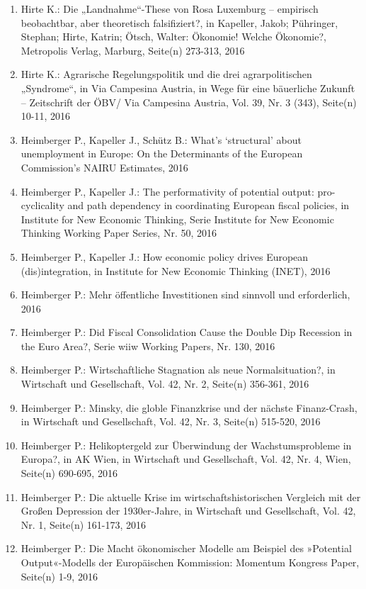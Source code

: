 \begin{enumerate}
	 \item Hirte K.: Die „Landnahme“-These von Rosa Luxemburg – empirisch beobachtbar, aber theoretisch falsifiziert?, in Kapeller, Jakob; Pühringer, Stephan; Hirte, Katrin; Ötsch, Walter: Ökonomie! Welche Ökonomie?, Metropolis Verlag, Marburg, Seite(n) 273-313, 2016
	 \item Hirte K.: Agrarische Regelungspolitik und die drei agrarpolitischen „Syndrome“, in Via Campesina Austria, in Wege für eine bäuerliche Zukunft – Zeitschrift der ÖBV/ Via Campesina Austria, Vol. 39, Nr. 3 (343), Seite(n) 10-11, 2016
	 \item Heimberger P., Kapeller J., Schütz B.: What’s ‘structural’ about unemployment in Europe: On the Determinants of the European Commission’s NAIRU Estimates, 2016
	 \item Heimberger P., Kapeller J.: The performativity of potential output: pro-cyclicality and path dependency in coordinating European fiscal policies, in Institute for New Economic Thinking, Serie Institute for New Economic Thinking  Working Paper Series, Nr. 50, 2016
	 \item Heimberger P., Kapeller J.: How economic policy drives European (dis)integration, in Institute for New Economic Thinking (INET), 2016
	 \item Heimberger P.: Mehr öffentliche Investitionen sind sinnvoll und erforderlich, 2016
	 \item Heimberger P.: Did Fiscal Consolidation Cause the Double Dip Recession in the Euro Area?, Serie wiiw Working Papers, Nr. 130, 2016
	 \item Heimberger P.: Wirtschaftliche Stagnation als \glqq neue Normalsituation\grqq{}?, in Wirtschaft und Gesellschaft, Vol. 42, Nr. 2, Seite(n) 356-361, 2016
	 \item Heimberger P.: Minsky, die globle Finanzkrise und der nächste Finanz-Crash, in Wirtschaft und Gesellschaft, Vol. 42, Nr. 3, Seite(n) 515-520, 2016
	 \item Heimberger P.: Helikoptergeld zur Überwindung der Wachstumsprobleme in Europa?, in AK Wien, in Wirtschaft und Gesellschaft, Vol. 42, Nr. 4, Wien, Seite(n) 690-695, 2016
	 \item Heimberger P.: Die aktuelle Krise im wirtschaftshistorischen Vergleich mit der Großen Depression der 1930er-Jahre, in Wirtschaft und Gesellschaft, Vol. 42, Nr. 1, Seite(n) 161-173, 2016
	 \item Heimberger P.: Die Macht ökonomischer Modelle am Beispiel des »Potential Output«-Modells der Europäischen Kommission: Momentum Kongress Paper, Seite(n) 1-9, 2016

\end{enumerate}
